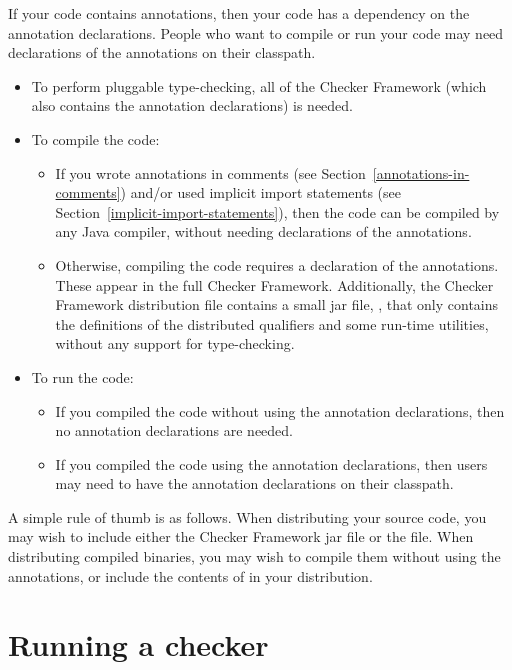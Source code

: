 If your code contains annotations, then your code has a dependency on the
annotation declarations.  People who want to compile or run your code may
need declarations of the annotations on their classpath.

\begin{itemize}
\item
To perform pluggable type-checking, all of the Checker Framework (which
also contains the annotation declarations) is needed.
\item
To compile the code:
\begin{itemize}
\item
  If you wrote annotations in comments (see
  Section~\ref{annotations-in-comments}) and/or used implicit import
  statements (see Section~\ref{implicit-import-statements}), then the code
  can be compiled by any Java compiler, without needing declarations of the
  annotations.
\item
  Otherwise, compiling the code requires a declaration of the annotations.
  These appear in the full Checker Framework.  Additionally, the Checker
  Framework distribution  file contains a small jar file,
  , that only contains the definitions of the
  distributed qualifiers and some run-time utilities, without any support for type-checking.
\end{itemize}
\item
To run the code:
\begin{itemize}
\item
  If you compiled the code without using the annotation declarations, then
  no annotation declarations are needed.
\item
  If you compiled the code using the annotation declarations, then users
  may need to have the annotation declarations on their classpath.
\end{itemize}
\end{itemize}

A simple rule of thumb is as follows.  When distributing your source code,
you may wish to include either the Checker Framework jar file or the
 file.  When distributing compiled binaries, you
may wish to compile them without using the annotations, or include the
contents of  in your distribution.


\section{Running a checker\label{running}}

